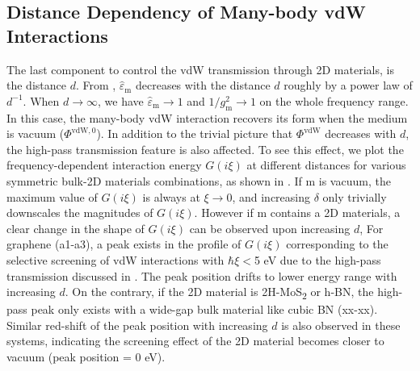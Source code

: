 \subsection{Distance Dependency of Many-body vdW Interactions}
\label{sec:vdw-distance}

The last component to control the vdW transmission through 2D
materials, is the distance $d$.  From , \(\hat{\varepsilon}_{\mathrm{m}}\) decreases with the
distance \(d\) roughly by a power law of \(d^{-1}\). When
\(d \to \infty\), we have \(\hat{\varepsilon}_{\mathrm{m}} \to 1\) and
\(1/g_{\mathrm{m}}^{2} \to 1\) on the whole frequency range. In this
case, the many-body vdW interaction recovers its form when the medium
is vacuum ($\Phi^{\mathrm{vdW}, 0}$).
%
In addition to the trivial picture that $\Phi^{\mathrm{vdW}}$
decreases with $d$, the
high-pass transmission feature is also affected.
%
To see this effect, we plot the frequency-dependent interaction energy
\(G(i \xi)\) at different distances for various symmetric bulk-2D
  materials combinations, as shown in
.
%
If m is vacuum, the maximum value of $G(i \xi)$ is always at
$\xi \to 0$, and increasing $\delta$ only trivially down\-scales the
magnitudes of $G(i \xi)$. However if m contains a 2D materials, a
clear change in the shape of \(G(i \xi)\) can be observed upon
increasing $d$,
%
For graphene (a1-a3), a peak exists in the profile of
\(G(i \xi)\) corresponding to the selective screening of vdW
interactions with $\hbar \xi<$5 eV due to the high-pass transmission
discussed in .
%
The peak position drifts to lower energy range with increasing $d$.
%
On the contrary, if the 2D material is 2H-MoS\textsubscript{2} or
h-BN, the high-pass peak only exists with a wide-gap bulk material
like cubic BN (xx-xx). Similar red-shift of the peak
position with increasing \(d\) is also observed in these systems,
indicating the screening effect of the 2D material becomes closer to
vacuum (peak position = 0 eV).


